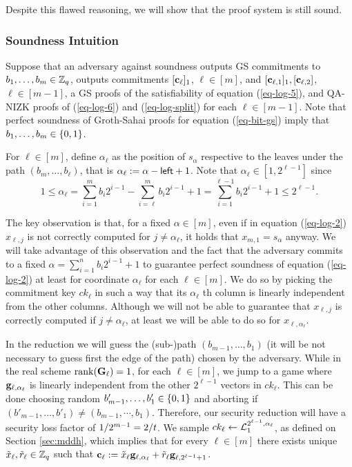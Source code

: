 Despite this flawed reasoning, we will show that the proof system is still sound.

\subsubsection{Soundness Intuition}
Suppose that an adversary against soundness outputs GS commitments to \(b_1,\ldots,b_{m}\in\mathbb{Z}_q\), outputs commitments \([\mathbf{c}_\ell]_1\), $\ell\in[m]$, and \([\mathbf{c}_{\ell,1}]_1,[\mathbf{c}_{\ell,2}]\), $\ell\in[m-1]$, a GS proofs of the satisfiability of equation (\ref{eq-log-5}), and QA-NIZK proofs of (\ref{eq-log-6}) and (\ref{eq-log-split}) for each \(\ell\in[m-1]\).
Note that perfect soundness of Groth-Sahai proofs for equation (\ref{eq-bit-gs}) imply that \(b_1,\ldots,b_m\in\{0,1\}\).

For $\ell\in[m]$, define $\alpha_\ell$ as the position of $s_\alpha$ respective to the leaves under the path $(b_m,\ldots, b_\ell)$, that is $\alpha_\ell:=\alpha-{\mathsf{left}}+1$. Note that $\alpha_\ell \in[1,2^{\ell-1}]$ since
$$
1\leq\alpha_\ell = \sum_{i=1}^m b_i2^{i-1}-\sum_{i=\ell}^mb_i2^{i-1}+1 = \sum_{i=1}^{\ell-1}b_i2^{i-1}+1\leq 2^{\ell-1}.
$$

The key observation is that, for a fixed $\alpha\in[m]$, even if in equation (\ref{eq-log-2}) $x_{\ell,j}$ is not correctly computed for $j\neq\alpha_\ell$, it holds that $x_{m,1}=s_\alpha$ anyway. We will take advantage of this observation and the fact that the adversary commits to a fixed $\alpha=\sum_{i=1}^n b_i2^{i-1}+1$ to guarantee perfect soundness of equation (\ref{eq-log-2}) at least for coordinate $\alpha_\ell$ for each $\ell\in[m]$. We do so by picking the commitment key $ck_\ell$ in such a way that its $\alpha_\ell$ th column is linearly independent from the other columns. Although we will not be able to guarantee that $x_{\ell,j}$ is correctly computed if $j\neq\alpha_\ell$, at least we will be able to do so for $x_{\ell,\alpha_\ell}$.

In the reduction we will guess the (sub-)path $(b_{m-1},\ldots, b_1)$ (it will be not necessary to guess first the edge of the path) chosen by the adversary. While in the real scheme $\mathrm{rank}(\mathbf{{G}}_\ell)=1$, for each $\ell\in[m]$, we jump to a game where $\mathbf{g}_{\ell,\alpha_\ell}$ is linearly independent from the other $2^{\ell-1}$ vectors in $ck_\ell$. This can be done choosing  random $b'_{m-1},\ldots, b'_1\in\{0,1\}$ and aborting if $(b'_{m-1},\ldots, b'_{1})\neq(b_{m-1},\cdots, b_1)$. Therefore, our security reduction will have a security loss factor of $1/2^{m-1}=2/t$. We sample $ck_\ell\gets\mathcal{L}_1^{2^{\ell-1},\alpha_\ell}$, as defined on Section \ref{sec:mddh}, which implies that for every $\ell\in[m]$ there exists unique $\tilde{x}_{\ell},\tilde{r}_\ell\in\mathbb{Z}_q$ such that $\mathbf{c}_\ell:=\tilde{x}_\ell\mathbf{g}_{\ell,\alpha_\ell}+\tilde{r}_\ell\mathbf{g}_{\ell,2^{\ell-1}+1}$.

